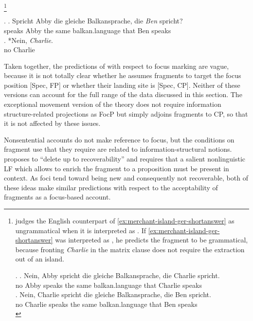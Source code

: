 %
\footnote{\citet{merchant2004} judges the English counterpart of \ref{ex:merchant-island-ger-shortanswer} as ungrammatical when it is interpreted as \Next[a]. If \ref{ex:merchant-island-ger-shortanswer} was interpreted as \Next[b], he predicts the fragment to be grammatical, because fronting \textit{Charlie} in the matrix clause does not require the extraction out of an island.

\ex. \ag. Nein, Abby spricht die gleiche Balkansprache, die Charlie spricht.\\
	 no Abby speaks the same balkan.language that Charlie speaks\\
     \bg. Nein, Charlie spricht die gleiche Balkansprache, die Ben spricht.\\
     	 no Charlie speaks the same balkan.language that Ben speaks\\
       
}
\afterfn%
%

\newpage
\ex. \ag. Spricht Abby die gleiche Balkansprache, die \textit{Ben} spricht?\\
	  speaks Abby the same balkan.language that Ben speaks\\
\bg. *Nein, \textit{Charlie}.\label{ex:merchant-island-ger-shortanswer}\\
      no Charlie\\

Taken together, the predictions of \citet{merchant2004} with respect to focus marking are vague, because it is not totally clear whether he assumes fragments to target the focus position [Spec, FP] or whether their landing site is [Spec, CP]. Neither of these versions can account for the full range of the data discussed in this section. The exceptional movement version of the theory \citep{weir2014} does not require information structure-related projections as FocP but simply adjoins fragments to CP, so that it is not affected by these issues.

Nonsentential accounts do not make reference to focus, but the conditions on fragment use that they require are related to information-structural notions. \citet{barton1990} proposes to ``delete up to recoverability'' and \citet{stainton2006} requires that a salient nonlinguistic LF which allows to enrich the fragment to a proposition must be present in context. As foci tend toward being new and consequently not recoverable, both of these ideas make similar predictions with respect to the acceptability of fragments as a focus-based account.

